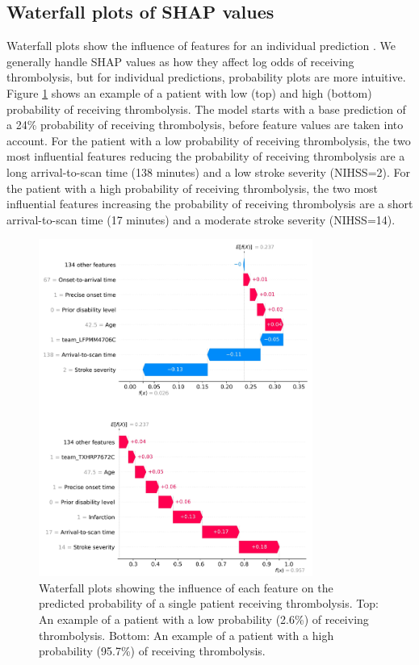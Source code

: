 \begin{itemize}

\subsection{Waterfall plots of SHAP values}
Waterfall plots show the influence of features for an individual prediction . We generally handle SHAP values as how they affect log odds of receiving thrombolysis, but for individual predictions, probability plots are more intuitive. Figure \ref{fig:results_waterfall} shows an example of a patient with low (top) and high (bottom) probability of receiving thrombolysis. The model starts with a base prediction of a 24\% probability of receiving thrombolysis, before feature values are taken into account. For the patient with a low probability of receiving thrombolysis, the two most influential features reducing the probability of receiving thrombolysis are a long arrival-to-scan time (138 minutes) and a low stroke severity (NIHSS=2). For the patient with a high probability of receiving thrombolysis, the two most influential features increasing the probability of receiving thrombolysis are a short arrival-to-scan time (17 minutes) and a moderate stroke severity (NIHSS=14). 

\begin{figure}
\centering
\includegraphics[width=0.8\textwidth]{./images/waterfall}
\caption{Waterfall plots showing the influence of each feature on the predicted probability of a single patient receiving thrombolysis. Top: An example of a patient with a low probability (2.6\%) of receiving thrombolysis. Bottom: An example of a patient with a high probability (95.7\%) of receiving thrombolysis.}
\label{fig:results_waterfall}
\end{figure}


\end{itemize}
